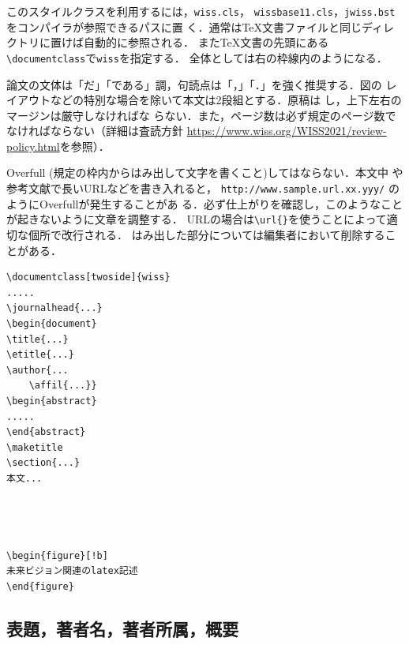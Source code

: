 \documentclass[twoside]{wiss}
\begin{document}
このスタイルクラスを利用するには，\verb|wiss.cls|，
\verb|wissbase11.cls|，\verb|jwiss.bst|をコンパイラが参照できるパスに置
く．通常は\TeX 文書ファイルと同じディレクトリに置けば自動的に参照される．
また\TeX 文書の先頭にある\verb|\documentclass|で\verb|wiss|を指定する．
全体としては右の枠線内のようになる．

論文の文体は「だ」「である」調，句読点は「，」「．」を強く推奨する．図の
レイアウトなどの特別な場合を除いて本文は2段組とする．原稿は
し，上下左右のマージンは厳守しなければな
らない．また，ページ数は必ず規定のページ数でなければならない（詳細は査読方針 \url{https://www.wiss.org/WISS2021/review-policy.html}を参照）．

Overfull (規定の枠内からはみ出して文字を書くこと)してはならない．本文中
や参考文献で長いURLなどを書き入れると，
\verb|http://www.sample.url.xx.yyy/| のようにOverfullが発生することがあ
る．必ず仕上がりを確認し，このようなことが起きないように文章を調整する．
URLの場合は\verb|\url{}|を使うことによって適切な個所で改行される．
はみ出した部分については編集者において削除することがある．

\begin{screen}
\begin{verbatim}
\documentclass[twoside]{wiss}
.....
\journalhead{...}
\begin{document}
\title{...}
\etitle{...}
\author{...
    \affil{...}}
\begin{abstract}
.....
\end{abstract}
\maketitle
\section{...}
本文...




\begin{figure}[!b]
未来ビジョン関連のlatex記述
\end{figure}
\end{verbatim}
\end{screen}



\subsection{表題，著者名，著者所属，概要}
\end{document}
